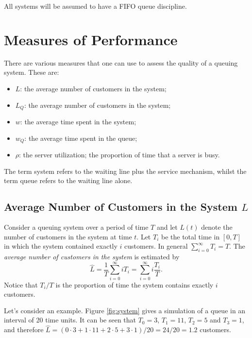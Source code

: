 \documentclass[
]{book}
\begin{document}
All systems will be assumed to have a FIFO queue discipline.

\hypertarget{measures-of-performance}{%
\section{Measures of Performance}\label{measures-of-performance}}

There are various measures that one can use to assess the quality of a queuing system. These are:

\begin{itemize}
\item
  \(L\): the average number of customers in the system;
\item
  \(L_Q\): the average number of customers in the system;
\item
  \(w\): the average time spent in the system;
\item
  \(w_Q\): the average time spent in the queue;
\item
  \(\rho\): the server utilization; the proportion of time that a server is busy.
\end{itemize}

The term system refers to the waiting line plus the service mechanism, whilst the term queue refers to the waiting line alone.

\hypertarget{average-number-of-customers-in-the-system-l}{%
\subsection{\texorpdfstring{Average Number of Customers in the System \(L\)}{Average Number of Customers in the System L}}\label{average-number-of-customers-in-the-system-l}}

Consider a queuing system over a period of time \(T\) and let \(L(t)\) denote the number of customers in the system at time \(t\). Let \(T_i\) be the total time in \([0,T]\) in which the system contained exactly \(i\) customers. In general \(\sum_{i=0}^{\infty}T_i = T\). The \emph{average number of customers in the system} is estimated by
\[
\hat{L}=\frac{1}{T}\sum_{i=0}^\infty iT_i=\sum_{i=0}^\infty i \frac{T_i}{T}.
\]
Notice that \(T_i/T\) is the proportion of time the system contains exactly \(i\) customers.

Let's consider an example. Figure \ref{fig:system} gives a simulation of a queue in an interval of 20 time units. It can be seen that \(T_0= 3\), \(T_1 = 11\), \(T_2 = 5\) and \(T_3 =1\), and therefore \(\hat{L}= (0\cdot 3 + 1\cdot 11 + 2\cdot 5 + 3\cdot 1)/20 = 24/20 = 1.2\) customers.
\end{document}
